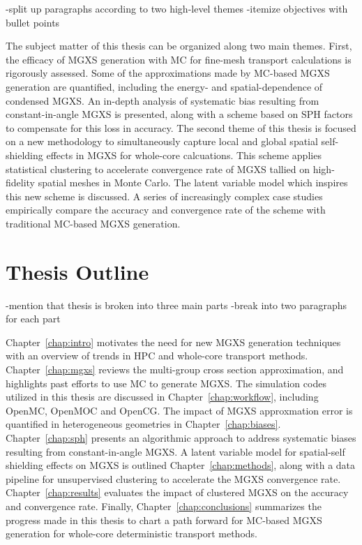 
-split up paragraphs according to two high-level themes
-itemize objectives with bullet points

The subject matter of this thesis can be organized along two main themes. First, the efficacy of \ac{MGXS} generation with \ac{MC} for fine-mesh transport calculations is rigorously assessed. Some of the approximations made by \ac{MC}-based \ac{MGXS} generation are quantified, including the energy- and spatial-dependence of condensed \ac{MGXS}. An in-depth analysis of systematic bias resulting from constant-in-angle \ac{MGXS} is presented, along with a scheme based on \ac{SPH} factors to compensate for this loss in accuracy. The second theme of this thesis is focused on a new methodology to simultaneously capture local and global spatial self-shielding effects in \ac{MGXS} for whole-core calcuations. This scheme applies statistical clustering to accelerate convergence rate of \ac{MGXS} tallied on high-fidelity spatial meshes in Monte Carlo. The latent variable model which inspires this new scheme is discussed. A series of increasingly complex case studies empirically compare the accuracy and convergence rate of the scheme with traditional \ac{MC}-based MGXS generation.


\section{Thesis Outline}
\label{sec:chap1-outline}

-mention that thesis is broken into three main parts
-break into two paragraphs for each part

Chapter~\ref{chap:intro} motivates the need for new \ac{MGXS} generation techniques with an overview of trends in \ac{HPC} and whole-core transport methods. Chapter~\ref{chap:mgxs} reviews the multi-group cross section approximation, and highlights past efforts to use \ac{MC} to generate \ac{MGXS}. The simulation codes utilized in this thesis are discussed in Chapter~\ref{chap:workflow}, including OpenMC, OpenMOC and OpenCG. The impact of \ac{MGXS} approxmation error is quantified in heterogeneous geometries in Chapter~\ref{chap:biases}. Chapter~\ref{chap:sph} presents an algorithmic approach to address systematic biases resulting from constant-in-angle \ac{MGXS}. A latent variable model for spatial-self shielding effects on \ac{MGXS} is outlined Chapter~\ref{chap:methods}, along with a data pipeline for unsupervised clustering to accelerate the \ac{MGXS} convergence rate. Chapter~\ref{chap:results} evaluates the impact of clustered \ac{MGXS} on the accuracy and convergence rate. Finally, Chapter~\ref{chap:conclusions} summarizes the progress made in this thesis to chart a path forward for \ac{MC}-based \ac{MGXS} generation for whole-core deterministic transport methods.

